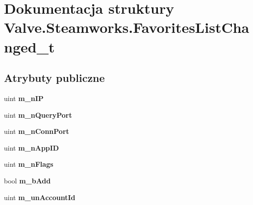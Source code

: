 \hypertarget{struct_valve_1_1_steamworks_1_1_favorites_list_changed__t}{}\section{Dokumentacja struktury Valve.\+Steamworks.\+Favorites\+List\+Changed\+\_\+t}
\label{struct_valve_1_1_steamworks_1_1_favorites_list_changed__t}
\subsection*{Atrybuty publiczne}
\begin{DoxyCompactItemize}
\item 
\mbox{\label{struct_valve_1_1_steamworks_1_1_favorites_list_changed__t_a61ead2ecc668c21870ba3ac2469b29f2}} 
uint {\bfseries m\+\_\+n\+IP}
\item 
\mbox{\label{struct_valve_1_1_steamworks_1_1_favorites_list_changed__t_a39f949a54e9c7f0aa3c7fb98715c9ff2}} 
uint {\bfseries m\+\_\+n\+Query\+Port}
\item 
\mbox{\label{struct_valve_1_1_steamworks_1_1_favorites_list_changed__t_a829fac09fde362ca4dfe27692256d86c}} 
uint {\bfseries m\+\_\+n\+Conn\+Port}
\item 
\mbox{\label{struct_valve_1_1_steamworks_1_1_favorites_list_changed__t_a3b5d92cbc915d6f8c82f7adc72ea92be}} 
uint {\bfseries m\+\_\+n\+App\+ID}
\item 
\mbox{\label{struct_valve_1_1_steamworks_1_1_favorites_list_changed__t_add9d5089afdeebe942fa3a4779b1e8f0}} 
uint {\bfseries m\+\_\+n\+Flags}
\item 
\mbox{\label{struct_valve_1_1_steamworks_1_1_favorites_list_changed__t_a449fb7cc5112e35ca50f56bfab777a7c}} 
bool {\bfseries m\+\_\+b\+Add}
\item 
\mbox{\label{struct_valve_1_1_steamworks_1_1_favorites_list_changed__t_a67a0224f5345b376c6344219781dbf68}} 
uint {\bfseries m\+\_\+un\+Account\+Id}
\end{DoxyCompactItemize}


